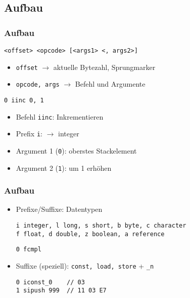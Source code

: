 \documentclass[10pt]{beamer}
\begin{document}
\subsection{Aufbau}
\begin{frame}[fragile]
\frametitle{Aufbau}
\begin{Verbatim}[frame=single]
<offset> <opcode> [<args1> <, args2>]
\end{Verbatim}
\begin{itemize}
\item {\tt offset} $\rightarrow$ aktuelle Bytezahl, Sprungmarker
\item {\tt opcode, args} $\rightarrow$ Befehl und Argumente
\end{itemize}

\pause
\begin{Verbatim}[frame=single]
0 iinc 0, 1
\end{Verbatim}
\begin{itemize}
\item Befehl {\tt iinc}: Inkrementieren
\item Prefix {\tt i}: $\rightarrow$ integer
\item Argument 1 ({\tt 0}): oberstes Stackelement
\item Argument 2 ({\tt 1}): um 1 erhöhen
\end{itemize}
\end{frame}


\begin{frame}[fragile]
\frametitle{Aufbau}
\begin{itemize}
\item Prefixe/Suffixe: Datentypen

{\tt {\btt i}  integer, {\btt l} long, {\btt s} short, {\btt b} byte, {\btt c} character\\
{\btt f} float, {\btt d} double, {\btt z} boolean, {\btt a} reference}

\begin{Verbatim}[frame=single]
0 fcmpl
\end{Verbatim}
\pause

\item Suffixe (speziell): {\tt const, load, store} + {\tt \_n}

\begin{Verbatim}[frame=single]
0 iconst_0    // 03
1 sipush 999  // 11 03 E7
\end{Verbatim}
\end{itemize}
\end{frame}
\end{document}
